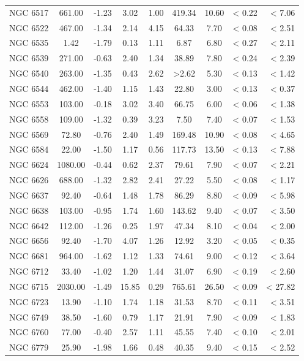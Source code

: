 \documentclass[doublespace,nopageskip]{VTthesis} %
\begin{document}
\begin{appendices}
\begin{center}
\begin{longtable}{lcccccccr}
NGC 6517 & 661.00 & -1.23 & 3.02 & 1.00 & 419.34 & 10.60 & < 0.22 & < 7.06\\
NGC 6522 & 467.00 & -1.34 & 2.14 & 4.15 & 64.33 & 7.70 & < 0.08 & < 2.51\\
NGC 6535 & 1.42 & -1.79 & 0.13 & 1.11 & 6.87 & 6.80 & < 0.27 & < 2.11\\
NGC 6539 & 271.00 & -0.63 & 2.40 & 1.34 & 38.89 & 7.80 & < 0.24 & < 2.39\\
NGC 6540 & 263.00 & -1.35 & 0.43 & 2.62 & >2.62 & 5.30 & < 0.13 & < 1.42\\
NGC 6544 & 462.00 & -1.40 & 1.15 & 1.43 & 22.80 & 3.00 & < 0.13 & < 0.37\\
NGC 6553 & 103.00 & -0.18 & 3.02 & 3.40 & 66.75 & 6.00 & < 0.06 & < 1.38\\
NGC 6558 & 109.00 & -1.32 & 0.39 & 3.23 & 7.50 & 7.40 & < 0.07 & < 1.53\\
NGC 6569 & 72.80 & -0.76 & 2.40 & 1.49 & 169.48 & 10.90 & < 0.08 & < 4.65\\
NGC 6584 & 22.00 & -1.50 & 1.17 & 0.56 & 117.73 & 13.50 & < 0.13 & < 7.88\\
NGC 6624 & 1080.00 & -0.44 & 0.62 & 2.37 & 79.61 & 7.90 & < 0.07 & < 2.21\\
NGC 6626 & 688.00 & -1.32 & 2.82 & 2.41 & 27.22 & 5.50 & < 0.08 & < 1.17\\
NGC 6637 & 92.40 & -0.64 & 1.48 & 1.78 & 86.29 & 8.80 & < 0.09 & < 5.98\\
NGC 6638 & 103.00 & -0.95 & 1.74 & 1.60 & 143.62 & 9.40 & < 0.07 & < 3.50\\
NGC 6642 & 112.00 & -1.26 & 0.25 & 1.97 & 47.34 & 8.10 & < 0.04 & < 2.00\\
NGC 6656 & 92.40 & -1.70 & 4.07 & 1.26 & 12.92 & 3.20 & < 0.05 & < 0.35\\
NGC 6681 & 964.00 & -1.62 & 1.12 & 1.33 & 74.61 & 9.00 & < 0.12 & < 3.64\\
NGC 6712 & 33.40 & -1.02 & 1.20 & 1.44 & 31.07 & 6.90 & < 0.19 & < 2.60\\
NGC 6715 & 2030.00 & -1.49 & 15.85 & 0.29 & 765.61 & 26.50 & < 0.09 & < 27.82\\
NGC 6723 & 13.90 & -1.10 & 1.74 & 1.18 & 31.53 & 8.70 & < 0.11 & < 3.51\\
NGC 6749 & 38.50 & -1.60 & 0.79 & 1.17 & 21.91 & 7.90 & < 0.09 & < 1.83\\
NGC 6760 & 77.00 & -0.40 & 2.57 & 1.11 & 45.55 & 7.40 & < 0.10 & < 2.01\\
NGC 6779 & 25.90 & -1.98 & 1.66 & 0.48 & 40.35 & 9.40 & < 0.15 & < 2.52\\

\end{longtable}
\end{center}
\end{appendices}
\end{document}
